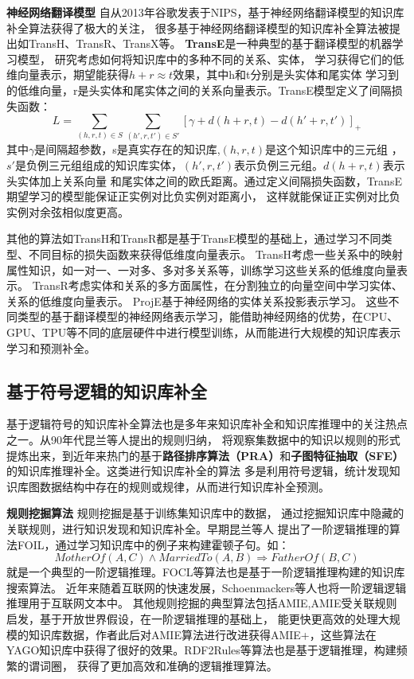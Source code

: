 \textbf{神经网络翻译模型} 自从2013年谷歌发表于NIPS，基于神经网络翻译模型的知识库补全算法获得了极大的关注，
很多基于神经网络翻译模型的知识库补全算法被提出如TransH、TransR、TransX等。
\textbf{TransE}是一种典型的基于翻译模型的机器学习模型，
研究考虑如何将知识库中的多种不同的关系、实体，
学习获得它们的低维向量表示，期望能获得$h+r\approx t$效果，其中h和t分别是头实体和尾实体
学习到的低维向量，r是头实体和尾实体之间的关系向量表示。TransE模型定义了间隔损失函数：
$$L=\sum_{(h,r,t)\in S} \sum_{(h',r,t')\in S'}[\gamma+d(h+r,t)-d(h'+r,t')]_{+}$$
其中$\gamma$是间隔超参数，s是真实存在的知识库,$(h,r,t)$是这个知识库中的三元组
，$s'$是负例三元组组成的知识库实体，$(h',r,t')$表示负例三元组。$d(h+r,t)$表示头实体加上关系向量
和尾实体之间的欧氏距离。通过定义间隔损失函数，TransE期望学习的模型能保证正实例对比负实例对距离小，
这样就能保证正实例对比负实例对余弦相似度更高。

其他的算法如TransH和TransR都是基于TransE模型的基础上，通过学习不同类型、不同目标的损失函数来获得低维度向量表示。
TransH考虑一些关系中的映射属性知识，如一对一、一对多、多对多关系等，训练学习这些关系的低维度向量表示。
TransR\cite{Lin2015LearningEA}考虑实体和关系的多方面属性，在分割独立的向量空间中学习实体、关系的低维度向量表示。
ProjE\cite{Shi2017ProjEEP}基于神经网络的实体关系投影表示学习。
这些不同类型的基于翻译模型的神经网络表示学习，能借助神经网络的优势，在CPU、GPU、TPU等不同的底层硬件中进行模型训练，从而能进行大规模的知识库表示学习和预测补全。

\subsection{基于符号逻辑的知识库补全}
\label{cha:symbolic}
基于逻辑符号的知识库补全算法也是多年来知识库补全和知识库推理中的关注热点之一。从90年代昆兰等人提出的规则归纳，
将观察集数据中的知识以规则的形式提炼出来，到近年来热门的基于\textbf{路径排序算法（PRA）}和\textbf{子图特征抽取（SFE）}的知识库推理补全。这类进行知识库补全的算法
多是利用符号逻辑，统计发现知识库图数据结构中存在的规则或规律，从而进行知识库补全预测。

\textbf{规则挖掘算法} 规则挖掘是基于训练集知识库中的数据，
通过挖掘知识库中隐藏的关联规则，进行知识发现和知识库补全。早期昆兰等人
提出了一阶逻辑推理的算法FOIL\cite{Quinlan1993FOILAM}，通过学习知识库中的例子来构建霍顿子句。如：
$$MotherOf(A,C)\land MarriedTo(A,B)\Rightarrow FatherOf(B,C)$$
就是一个典型的一阶逻辑推理。FOCL\cite{PAZZANI1991DetectingAC}等算法也是基于一阶逻辑推理构建的知识库搜索算法。
近年来随着互联网的快速发展，Schoenmackers\cite{Schoenmackers:2010}等人也将一阶逻辑逻辑推理用于互联网文本中。
其他规则挖掘的典型算法包括AMIE\cite{Galarraga2013},AMIE受关联规则启发，基于开放世界假设，在一阶逻辑推理的基础上，
能更快更高效的处理大规模的知识库数据，作者此后对AMIE算法进行改进获得AMIE+\cite{Galrraga2015FastRM}，这些算法在
YAGO知识库中获得了很好的效果。RDF2Rules\cite{Wang2015RDF2RulesLR}等算法也是基于逻辑推理，构建频繁的谓词圈，
获得了更加高效和准确的逻辑推理算法。

